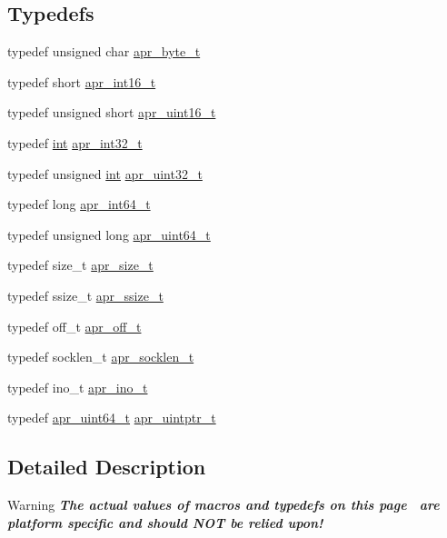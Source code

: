 \subsection*{Typedefs}
\begin{DoxyCompactItemize}
\item 
typedef unsigned char \hyperlink{group__apr__platform_gadcfa334915b4605a0052cb4ca542eb3a}{apr\+\_\+byte\+\_\+t}
\item 
typedef short \hyperlink{group__apr__platform_ga43c359f64f6c84d8af869539e0737df4}{apr\+\_\+int16\+\_\+t}
\item 
typedef unsigned short \hyperlink{group__apr__platform_ga3fb87c977e28a526d872d1081411b129}{apr\+\_\+uint16\+\_\+t}
\item 
typedef \hyperlink{pcre_8txt_a42dfa4ff673c82d8efe7144098fbc198}{int} \hyperlink{group__apr__platform_ga21ef1e35fd3ff9be386f3cb20164ff02}{apr\+\_\+int32\+\_\+t}
\item 
typedef unsigned \hyperlink{pcre_8txt_a42dfa4ff673c82d8efe7144098fbc198}{int} \hyperlink{group__apr__platform_ga558548a135d8a816c4787250744ea147}{apr\+\_\+uint32\+\_\+t}
\item 
typedef long \hyperlink{group__apr__platform_ga4b75afbf973dc6c8aea4ae75b044aa08}{apr\+\_\+int64\+\_\+t}
\item 
typedef unsigned long \hyperlink{group__apr__platform_ga722b277a42230f3fd41cb5be7a76cfb4}{apr\+\_\+uint64\+\_\+t}
\item 
typedef size\+\_\+t \hyperlink{group__apr__platform_gaaa72b2253f6f3032cefea5712a27540e}{apr\+\_\+size\+\_\+t}
\item 
typedef ssize\+\_\+t \hyperlink{group__apr__platform_ga215ebb88932bee220b766263ebbfe6fa}{apr\+\_\+ssize\+\_\+t}
\item 
typedef off\+\_\+t \hyperlink{group__apr__platform_ga6938af9075cec15c88299109381aa984}{apr\+\_\+off\+\_\+t}
\item 
typedef socklen\+\_\+t \hyperlink{group__apr__platform_gab613b0701b7a8b0ccd1a3c157a800f27}{apr\+\_\+socklen\+\_\+t}
\item 
typedef ino\+\_\+t \hyperlink{group__apr__platform_ga0a5ae63884288a9f69f4e384a23bad68}{apr\+\_\+ino\+\_\+t}
\item 
typedef \hyperlink{group__apr__platform_ga722b277a42230f3fd41cb5be7a76cfb4}{apr\+\_\+uint64\+\_\+t} \hyperlink{group__apr__platform_gabf3268b941400de57926ee0f0ca56aa2}{apr\+\_\+uintptr\+\_\+t}
\end{DoxyCompactItemize}


\subsection{Detailed Description}
\begin{DoxyWarning}{Warning}
{\bfseries {\itshape The actual values of macros and typedefs on this page~\newline
 are platform specific and should N\+OT be relied upon!}} 
\end{DoxyWarning}


